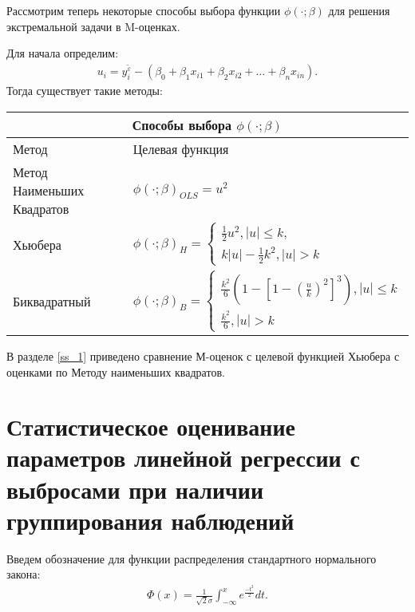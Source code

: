 Рассмотрим теперь некоторые способы выбора функции $\phi(\cdot;\beta)$ для решения экстремальной задачи в M-оценках.

Для начала определим:
\begin{eqnarray}
    u_i=y_i^{\widetilde{\varepsilon}}-(\beta_0+\beta_1 x_{i1}+\beta_2 x_{i2}+\dots+\beta_n x_{in}).
\end{eqnarray}
Тогда существует такие методы\cite{RobustRegression}:\hfill\break
\begin{center}
\begin{tabular}{ |p{3cm}|p{10cm} | }
    \hline
    \multicolumn{2}{|c|}{Способы выбора $\phi(\cdot;\beta)$} \\
    \hline
    Метод& Целевая функция\\
    \hline
    Метод Наименьших Квадратов&$\phi(\cdot;\beta)_{OLS}=u^2$\\
    \hline
    Хьюбера&$\phi(\cdot;\beta)_{H}=
        \begin{cases}
            \frac{1}{2}u^2, |u|\leq k,\\
            k|u|-\frac{1}{2}k^2, |u|>k
        \end{cases}$\\
    \hline
    Биквадратный& $\phi(\cdot;\beta)_{B}=
    \begin{cases}
        \frac{k^2}{6}(1-[1-(\frac{u}{k})^2]^3), |u|\leq k\\
        \frac{k^2}{6}, |u|>k
    \end{cases}$\\
    \hline
\end{tabular}
\end{center}

В разделе \ref{ss_1} приведено сравнение М-оценок с целевой функцией Хьюбера с оценками по Методу наименьших квадратов.

\newpage

\newpage
\section{Статистическое оценивание параметров линейной регрессии с выбросами при наличии группирования наблюдений}
Введем обозначение для функции распределения стандартного нормального закона:
\begin{eqnarray}
    \Phi(x)=\frac{1}{\sqrt{2}\sigma}\int_{-\infty}^{x}e^{\frac{-t^2}{2}}dt.
\end{eqnarray}

